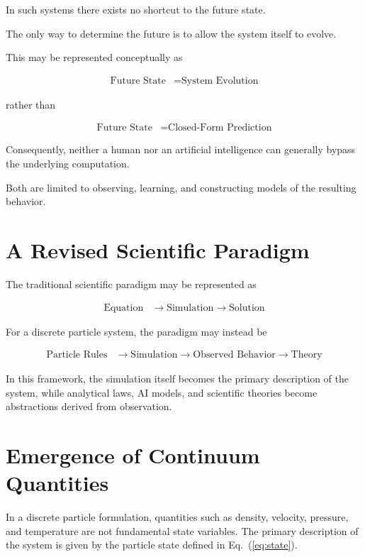 In such systems there exists no shortcut to the future state.

The only way to determine the future is to allow the system itself to evolve.

This may be represented conceptually as

\begin{align}
\text{Future State}
&=
\text{System Evolution}
\label{eq:irreducible}
\end{align}

rather than

\begin{align}
\text{Future State}
&=
\text{Closed-Form Prediction}
\label{eq:closed_form}
\end{align}

Consequently, neither a human nor an artificial intelligence can generally bypass the underlying computation.

Both are limited to observing, learning, and constructing models of the resulting behavior.

\section{A Revised Scientific Paradigm}

The traditional scientific paradigm may be represented as

\begin{align}
\text{Equation}
&\rightarrow
\text{Simulation}
\rightarrow
\text{Solution}
\label{eq:traditional}
\end{align}

For a discrete particle system, the paradigm may instead be

\begin{align}
\text{Particle Rules}
&\rightarrow
\text{Simulation}
\rightarrow
\text{Observed Behavior}
\rightarrow
\text{Theory}
\label{eq:particle_paradigm}
\end{align}

In this framework, the simulation itself becomes the primary description of the system, while analytical laws, AI models, and scientific theories become abstractions derived from observation.

\section{Emergence of Continuum Quantities}

In a discrete particle formulation, quantities such as density, velocity, pressure, and temperature are not fundamental state variables. The primary description of the system is given by the particle state defined in Eq.~(\ref{eq:state}).

